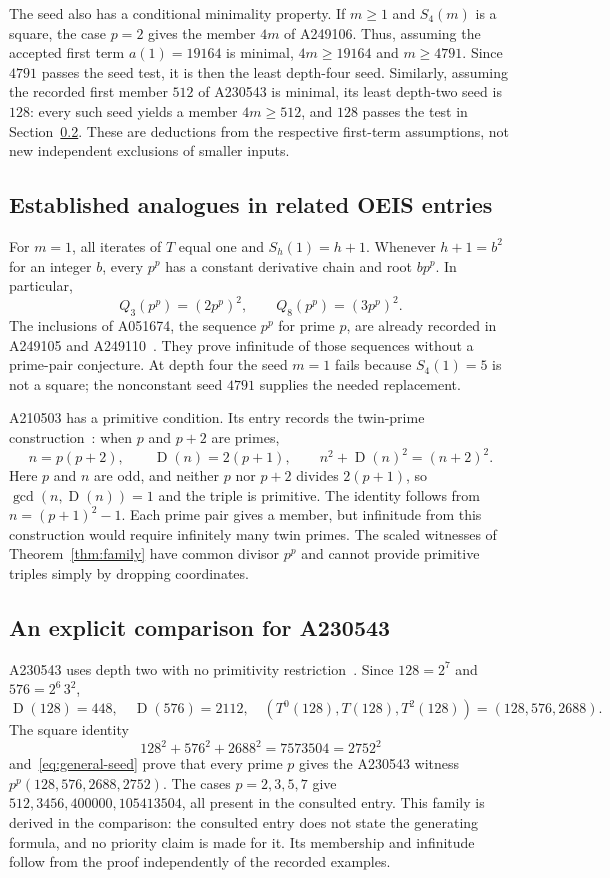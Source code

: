 \documentclass[11pt,a4paper]{article}
\theoremstyle{remark}
\newcommand{\D}{\operatorname{D}}
\begin{document}
The seed also has a conditional minimality property. If $m\ge1$ and
$S_4(m)$ is a square, the case $p=2$ gives the member $4m$ of A249106.
Thus, assuming the accepted first term $a(1)=19164$ is minimal,
$4m\ge19164$ and $m\ge4791$. Since $4791$ passes the seed test, it is
then the least depth-four seed. Similarly, assuming the recorded first
member $512$ of A230543 is minimal, its least depth-two seed is $128$:
every such seed yields a member $4m\ge512$, and $128$ passes the test
in Section~\ref{sec:quadruple}. These are deductions from the respective
first-term assumptions, not new independent exclusions of smaller inputs.

\subsection{Established analogues in related OEIS entries}
For $m=1$, all iterates of $T$ equal one and $S_h(1)=h+1$.
Whenever $h+1=b^2$ for an integer $b$, every $p^p$ has a constant
derivative chain and root $bp^p$. In particular,
\[
 Q_3(p^p)=(2p^p)^2,\qquad Q_8(p^p)=(3p^p)^2.
\]
The inclusions of A051674, the sequence $p^p$ for prime $p$, are already
recorded in A249105 and A249110~\cite{related,auxiliary}.
They prove infinitude of those sequences without a prime-pair conjecture.
At depth four the seed $m=1$ fails because $S_4(1)=5$ is not a square;
the nonconstant seed $4791$ supplies the needed replacement.

A210503 has a primitive condition. Its entry records the twin-prime
construction~\cite{related}: when $p$ and $p+2$ are primes,
\[
 n=p(p+2),\qquad \D(n)=2(p+1),\qquad
 n^2+\D(n)^2=(n+2)^2.
\]
Here $p$ and $n$ are odd, and neither $p$ nor $p+2$ divides
$2(p+1)$, so $\gcd(n,\D(n))=1$ and the triple is primitive.
The identity follows from $n=(p+1)^2-1$.
Each prime pair gives a member, but infinitude from this construction
would require infinitely many twin primes.
The scaled witnesses of Theorem~\ref{thm:family} have common divisor
$p^p$ and cannot provide primitive triples simply by dropping coordinates.

\subsection{An explicit comparison for A230543}\label{sec:quadruple}
A230543 uses depth two with no primitivity restriction~\cite{related}.
Since $128=2^7$ and $576=2^6\,3^2$,
\[
 \D(128)=448,\quad \D(576)=2112,\quad
 (T^0(128),T(128),T^2(128))=(128,576,2688).
\]
The square identity
\[
 128^2+576^2+2688^2=7573504=2752^2
\]
and~\eqref{eq:general-seed} prove that every prime $p$ gives the
A230543 witness $p^p(128,576,2688,2752)$.
The cases $p=2,3,5,7$ give $512,3456,400000,105413504$, all present
in the consulted entry. This family is derived in the comparison:
the consulted entry does not state the generating formula, and no
priority claim is made for it. Its membership and infinitude follow
from the proof independently of the recorded examples.
\end{document}

